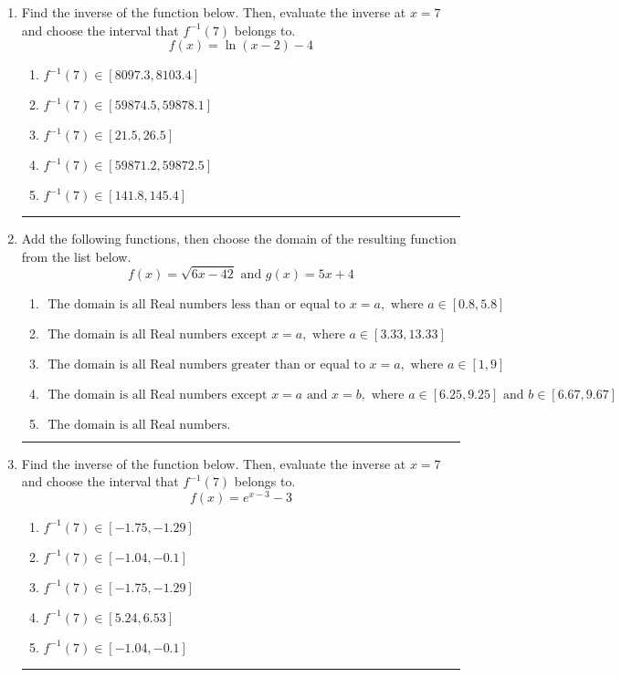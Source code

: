 \documentclass[14pt]{extbook}
\newcommand{\litem}[1]{\item#1\hspace*{-1cm}\rule{\textwidth}{0.4pt}}
\begin{document}
\begin{enumerate}
{\begin{enumerate}[label=\Alph*.]
\end{enumerate} }
\litem{
Find the inverse of the function below. Then, evaluate the inverse at $x = 7$ and choose the interval that $f^{-1}(7)$ belongs to.\[ f(x) = \ln{(x-2)}-4 \]\begin{enumerate}[label=\Alph*.]
\item \( f^{-1}(7) \in [8097.3, 8103.4] \)
\item \( f^{-1}(7) \in [59874.5, 59878.1] \)
\item \( f^{-1}(7) \in [21.5, 26.5] \)
\item \( f^{-1}(7) \in [59871.2, 59872.5] \)
\item \( f^{-1}(7) \in [141.8, 145.4] \)

\end{enumerate} }
\litem{
Add the following functions, then choose the domain of the resulting function from the list below.\[ f(x) = \sqrt{6x-42}  \text{ and } g(x) = 5x + 4 \]\begin{enumerate}[label=\Alph*.]
\item \( \text{ The domain is all Real numbers less than or equal to } x = a, \text{ where } a \in [0.8, 5.8] \)
\item \( \text{ The domain is all Real numbers except } x = a, \text{ where } a \in [3.33, 13.33] \)
\item \( \text{ The domain is all Real numbers greater than or equal to } x = a, \text{ where } a \in [1, 9] \)
\item \( \text{ The domain is all Real numbers except } x = a \text{ and } x = b, \text{ where } a \in [6.25, 9.25] \text{ and } b \in [6.67, 9.67] \)
\item \( \text{ The domain is all Real numbers. } \)

\end{enumerate} }
\litem{
Find the inverse of the function below. Then, evaluate the inverse at $x = 7$ and choose the interval that $f^{-1}(7)$ belongs to.\[ f(x) = e^{x-3}-3 \]\begin{enumerate}[label=\Alph*.]
\item \( f^{-1}(7) \in [-1.75, -1.29] \)
\item \( f^{-1}(7) \in [-1.04, -0.1] \)
\item \( f^{-1}(7) \in [-1.75, -1.29] \)
\item \( f^{-1}(7) \in [5.24, 6.53] \)
\item \( f^{-1}(7) \in [-1.04, -0.1] \)

\end{enumerate} }
\end{enumerate}
\end{document}
